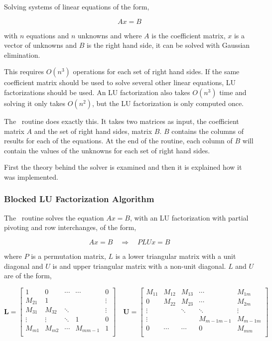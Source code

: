 Solving systems of linear equations of the form,

\[
Ax = B
\]

\noindent with $n$ equations and $n$ unknowns and where $A$ is the coefficient matrix, $x$ is a vector of
unknowns and $B$ is the right hand side, it can be solved with
Gaussian elimination.

This requires $O(n^3)$ operations for each set of right hand sides. If
the same coefficient matrix should be used to solve several other
linear equations, LU factorizations should be used. An LU
factorization also takes $O(n^3)$ time and solving it only takes
$O(n^2)$, but the LU factorization is only computed once.

The \LAPACK\ routine  does exactly this. It takes two
matrices as input, the coefficient matrix $A$ and the set of right
hand sides, matrix $B$. $B$ contains the columns of results for each
of the equations. At the end of the routine, each column of $B$ will
contain the values of the unknowns for each set of right hand sides.

First the theory behind the solver is examined and then it is
explained how it was implemented.

\subsubsection{Blocked LU Factorization Algorithm}

The \LAPACK\ routine  solves the equation $Ax = B$,
with an LU factorization with partial pivoting and row interchanges,
of the form,

\[
Ax = B \quad \Rightarrow \quad PLUx = B
\]

\noindent where $P$ is a permutation matrix, $L$ is a lower triangular
matrix with a unit diagonal and $U$ is and upper triangular matrix
with a non-unit diagonal. $L$ and $U$ are of the form,

\[
\mathbf{L} = \left[
\begin{array}{ccccc}
1       & 0     & \cdots &   \cdots  & 0 \\
M_{21}  & 1      &        &          &\vdots \\
M_{31}  & M_{32} & \ddots &          &  \vdots \\
\vdots & \vdots & \ddots &  1       & 0 \\
M_{m1}  & M_{m2} & \cdots  & M_{mm-1} &  1 \\
\end{array}
\right]
\quad
\mathbf{U} = \left[
\begin{array}{ccccc}
M_{11}  & M_{12} & M_{13} &  \cdots  & M_{1m} \\
0       & M_{22} & M_{23}  & \cdots  & M_{2m} \\
\vdots  &        & \ddots &  \ddots &  \vdots \\
\vdots  &        &        &  M_{m-1m-1} & M_{m-1m} \\
0       & \cdots & \cdots  & 0      &  M_{mm} \\
\end{array}
\right]
\]

